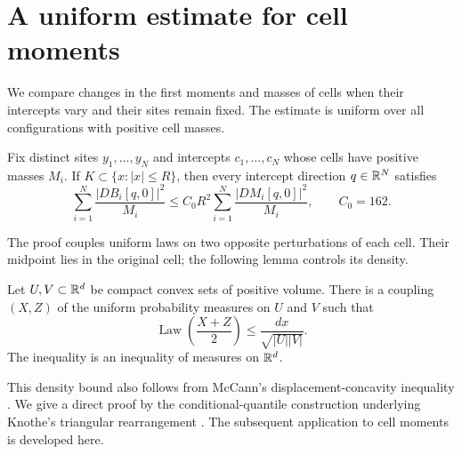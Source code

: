 \section{A uniform estimate for cell moments}
\label{sec:moments}

We compare changes in the first moments and masses of cells when their
intercepts vary and their sites remain fixed. The estimate is uniform
over all configurations with positive cell masses.

\begin{lemma}\label{moments:derivative}
Fix distinct sites $y_1,\ldots,y_N$ and intercepts $c_1,\ldots,c_N$
whose cells have positive masses $M_i$. If $K\subset\{x:|x|\le R\}$,
then every intercept direction $q\in\mathbb R^N$ satisfies
\[
  \sum_{i=1}^N\frac{|D B_i[q,0]|^2}{M_i}
  \le C_0R^2\sum_{i=1}^N\frac{|D M_i[q,0]|^2}{M_i},
  \qquad C_0=162.
\]
\end{lemma}

The proof couples uniform laws on two opposite perturbations of each
cell. Their midpoint lies in the original cell; the following lemma
controls its density.

\begin{lemma}\label{moments:midpoint}
Let $U,V\subset\mathbb R^d$ be compact convex sets of positive volume. There is a
coupling $(X,Z)$ of the uniform probability measures on $U$ and $V$ such that
\[
  \operatorname{Law}\!\left(\frac{X+Z}{2}\right)
  \le \frac{dx}{\sqrt{|U||V|}}.
\]
The inequality is an inequality of measures on $\mathbb R^d$.
\end{lemma}

This density bound also follows from McCann's displacement-concavity
inequality \cite[Theorem~2.3]{McCann1997}. We give a direct proof by the
conditional-quantile construction underlying Knothe's triangular
rearrangement \cite{Knothe1957,CarlierGalichonSantambrogio2010}.
The subsequent application to cell moments is developed here.

